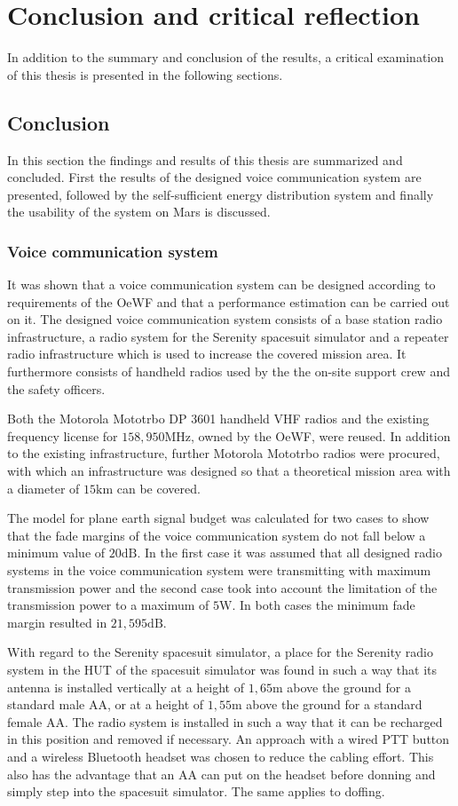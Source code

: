 \chapter{Conclusion and critical reflection}
In addition to the summary and conclusion of the results, a critical examination of this thesis is presented in the following sections. 

\section{Conclusion}
In this section the findings and results of this thesis are summarized and concluded. First the results of the designed voice communication system are presented, followed by the self-sufficient energy distribution system and finally the usability of the system on Mars is discussed. 

\subsection{Voice communication system}
It was shown that a voice communication system can be designed according to requirements of the OeWF and that a performance estimation can be carried out on it. The designed voice communication system consists of a base station radio infrastructure, a radio system for the Serenity spacesuit simulator and a repeater radio infrastructure which is used to increase the covered mission area. It furthermore consists of handheld radios used by the the on-site support crew and the safety officers.

Both the Motorola Mototrbo DP 3601 handheld VHF radios and the existing frequency license for $158,950\mathrm{MHz}$, owned by the OeWF, were reused. In addition to the existing infrastructure, further Motorola Mototrbo radios were procured, with which an infrastructure was designed so that a theoretical mission area with a diameter of $15\mathrm{km}$ can be covered. 

The model for plane earth signal budget was calculated for two cases to show that the fade margins of the voice communication system do not fall below a minimum value of $20\mathrm{dB}$. In the first case it was assumed that all designed radio systems in the voice communication system were transmitting with maximum transmission power and the second case took into account the limitation of the transmission power to a maximum of $5\mathrm{W}$. In both cases the minimum fade margin resulted in $21,595\mathrm{dB}$.

With regard to the Serenity spacesuit simulator, a place for the Serenity radio system in the HUT of the spacesuit simulator was found in such a way that its antenna is installed vertically at a height of $1,65\mathrm{m}$ above the ground for a standard male AA, or at a height of $1,55\mathrm{m}$ above the ground for a standard female AA. The radio system is installed in such a way that it can be recharged in this position and removed if necessary. An approach with a wired PTT button and a wireless Bluetooth headset was chosen to reduce the cabling effort. This also has the advantage that an AA can put on the headset before donning and simply step into the spacesuit simulator. The same applies to doffing. 

